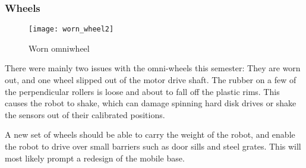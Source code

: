 \subsubsection{Wheels}

\begin{wrapfigure}{r}{0.4\textwidth}
	\vspace{-20pt}
	\begin{center}
		\texttt{[image: worn\_wheel2]}
	\end{center}
	
	\caption{Worn omniwheel}
	\label{fig:worn_wheel}
\end{wrapfigure}

There were mainly two issues with the omni-wheels this semester: They are worn out, and one wheel slipped out of the motor drive shaft. The rubber on a few of the perpendicular rollers is loose and about to fall off the plastic rims. This causes the robot to shake, which can damage spinning hard disk drives or shake the sensors out of their calibrated positions.   

A new set of wheels should be able to carry the weight of the robot, and enable the robot to drive over small barriers such as door sills and steel grates. This will most likely prompt a redesign of the mobile base.